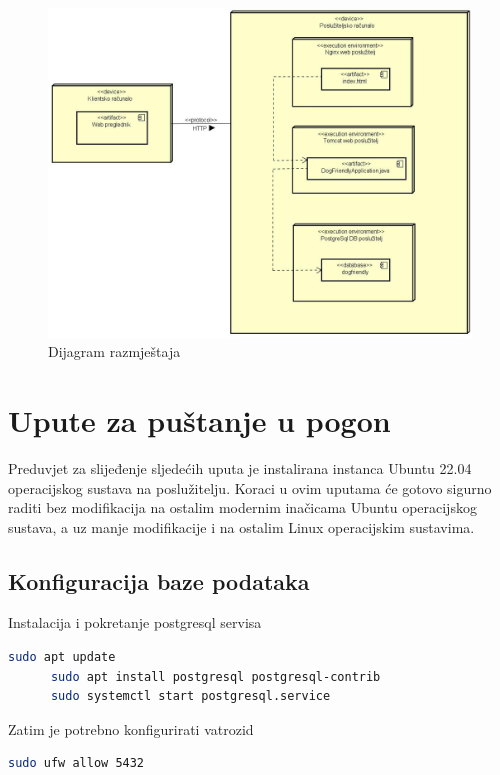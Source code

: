     \begin{figure}[H]
        	\includegraphics[width=\textwidth]{img/Dijagram_razmjestaja.jpg}
        	\centering
        	\caption{Dijagram razmještaja}
        	\label{fig:promjene}
        \end{figure}

    \eject
    \section{Upute za puštanje u pogon}

    Preduvjet za slijeđenje sljedećih uputa je instalirana instanca Ubuntu 22.04 operacijskog sustava na poslužitelju. Koraci u ovim uputama će gotovo sigurno raditi bez modifikacija na ostalim modernim inačicama Ubuntu operacijskog sustava, a uz manje modifikacije i na ostalim Linux operacijskim sustavima.

    \subsection{Konfiguracija baze podataka}

    Instalacija i pokretanje postgresql servisa
    \begin{lstlisting}[language=bash]
      sudo apt update
      sudo apt install postgresql postgresql-contrib
      sudo systemctl start postgresql.service
    \end{lstlisting}

    Zatim je potrebno konfigurirati vatrozid
    \begin{lstlisting}[language=bash]
      sudo ufw allow 5432
    \end{lstlisting}

